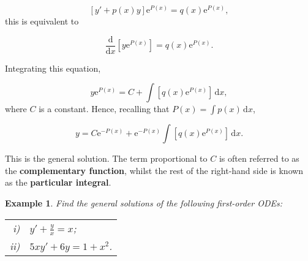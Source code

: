 \documentclass[a4paper]{report}
\newtheorem{example}{Example}[chapter]
\begin{document}
\begin{displaymath}
\left[y'+p(x)y\right] \mathrm{e}^{P(x)}=q(x) \mathrm{e}^{P(x)},
\end{displaymath}
\noindent this is equivalent to

\begin{equation}
\label{eqn:first:preintfactor}
\frac{\mathrm{d}}{\mathrm{d}x}\left[y\mathrm{e}^{P(x)}\right] = q(x) \mathrm{e}^{P(x)}.
\end{equation}

\noindent Integrating this equation, 

\begin{displaymath}
y\mathrm{e}^{P(x)} = C + \int \left[q(x) \mathrm{e}^{P(x)}\right]\,\mathrm{d}x,
\end{displaymath}
\noindent where $C$ is a constant. Hence, recalling that $\displaystyle{P(x)=\int p(x)\,\mathrm{d}x}$, 

\begin{equation}
\label{eqn:first:intfactor}
y = C \mathrm{e}^{-P(x)} + \mathrm{e}^{-P(x)}\int \left[q(x) \mathrm{e}^{P(x)}\right]\,\mathrm{d}x.
\end{equation}

\noindent This is the general solution. The term proportional to $C$ is often referred to as the {\bf complementary function}, whilst the rest of the right-hand side is known as the {\bf particular integral}. 

\begin{example}
\label{ex:first:intfac}
Find the general solutions of the following first-order ODEs:\\ 

\begin{tabular}{rl}
i) & $\displaystyle{y'+\frac{y}{x} = x}$;\\
ii) & $\displaystyle{5xy'+6y = 1+x^2}$.
\end{tabular}

\end{example}
\end{document}
